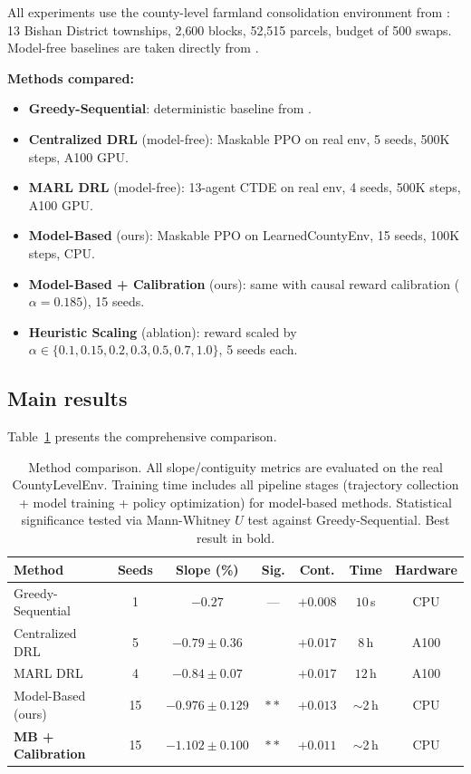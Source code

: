 \documentclass[11pt]{article}
\begin{document}
All experiments use the county-level farmland consolidation environment from \citet{zhou2026county}: 13 Bishan District townships, 2{,}600 blocks, 52{,}515 parcels, budget of 500 swaps. Model-free baselines are taken directly from \citet{zhou2026county}.

\textbf{Methods compared:}
\begin{itemize}
\item \textbf{Greedy-Sequential}: deterministic baseline from \citet{zhou2026county}.
\item \textbf{Centralized DRL} (model-free): Maskable PPO on real env, 5 seeds, 500K steps, A100 GPU.
\item \textbf{MARL DRL} (model-free): 13-agent CTDE on real env, 4 seeds, 500K steps, A100 GPU.
\item \textbf{Model-Based} (ours): Maskable PPO on LearnedCountyEnv, 15 seeds, 100K steps, CPU.
\item \textbf{Model-Based + Calibration} (ours): same with causal reward calibration ($\alpha = 0.185$), 15 seeds.
\item \textbf{Heuristic Scaling} (ablation): reward scaled by $\alpha \in \{0.1, 0.15, 0.2, 0.3, 0.5, 0.7, 1.0\}$, 5 seeds each.
\end{itemize}

\subsection{Main results}

Table~\ref{tab:main} presents the comprehensive comparison.

\begin{table}[htbp]
\centering
\caption{Method comparison. All slope/contiguity metrics are evaluated on the real CountyLevelEnv. Training time includes all pipeline stages (trajectory collection + model training + policy optimization) for model-based methods. Statistical significance tested via Mann-Whitney $U$ test against Greedy-Sequential. Best result in bold.}
\label{tab:main}
\begin{tabular}{lcccccc}
\toprule
Method & Seeds & Slope (\%) & Sig. & Cont. & Time & Hardware \\
\midrule
Greedy-Sequential      & 1  & $-0.27$              & ---  & $+0.008$ & $10$\,s   & CPU \\
Centralized DRL        & 5  & $-0.79 \pm 0.36$     &      & $+0.017$ & $8$\,h    & A100 \\
MARL DRL               & 4  & $-0.84 \pm 0.07$     &      & $+0.017$ & $12$\,h   & A100 \\
\midrule
Model-Based (ours)     & 15 & $-0.976 \pm 0.129$   & $**$ & $+0.013$ & $\sim$2\,h & CPU \\
\textbf{MB + Calibration} & 15 & $\mathbf{-1.102 \pm 0.100}$ & $**$ & $+0.011$ & $\sim$2\,h & CPU \\
\bottomrule
\end{tabular}
\end{table}
\end{document}

